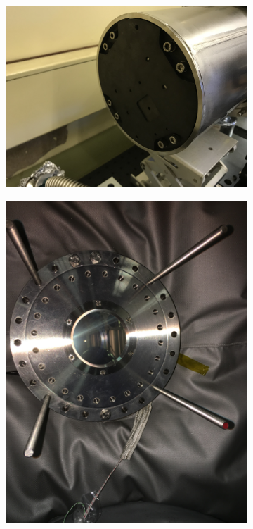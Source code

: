          
\begin{figure}[!ht]
     \begin{subfigure}{0.49\linewidth}
         \centering
         \includegraphics[trim={1500 500 0 0},clip,width=\textwidth]{Chapters/chapter2/figs/2018-07-23 11.25.01.jpg}
         \caption{}
         \label{fig:IRVB4}
     \end{subfigure}
     \begin{subfigure}{0.49\linewidth}
         \centering
         \includegraphics[trim={500 0 1000 500},clip,width=\textwidth]{Chapters/chapter2/figs/IMG_7199.JPG}

\end{subfigure}
\end{figure}
